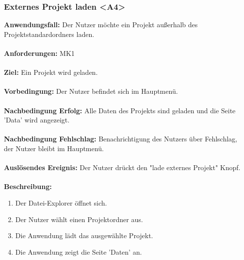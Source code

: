 \documentclass[parskip=full]{scrartcl} %
\begin{document}
\subsubsection*{Externes Projekt laden <A4>}
\textbf{Anwendungsfall:} Der Nutzer möchte ein Projekt außerhalb des Projektstandardordners laden.\\\\
\textbf{Anforderungen:} MK1\\\\
\textbf{Ziel:} Ein Projekt wird geladen. \\\\
\textbf{Vorbedingung:} Der Nutzer befindet sich im Hauptmenü.  \\\\
\textbf{Nachbedingung Erfolg:} Alle Daten des Projekts sind geladen und die Seite 'Data' wird angezeigt. \\\\
\textbf{Nachbedingung Fehlschlag:} Benachrichtigung des Nutzers über Fehlschlag, der Nutzer bleibt im Hauptmenü. \\\\
\textbf{Auslösendes Ereignis:}  Der Nutzer drückt den "lade externes Projekt" Knopf. \\\\
\textbf{Beschreibung:}
\begin{enumerate}
    \item Der Datei-Explorer öffnet sich.
    \item Der Nutzer wählt einen Projektordner aus.
    \item Die Anwendung lädt das ausgewählte Projekt.
    \item Die Anwendung zeigt die Seite 'Daten' an.
\end{enumerate}
\newpage
\end{document}
